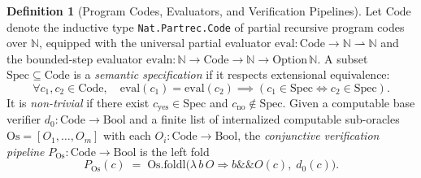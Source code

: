 \documentclass[11pt]{article}
\theoremstyle{plain}
\theoremstyle{definition}
\newtheorem{definition}[theorem]{Definition}
\theoremstyle{remark}
\newcommand{\Code}{\mathrm{Code}}
\newcommand{\eval}{\mathrm{eval}}
\newcommand{\evaln}{\mathrm{evaln}}
\newcommand{\Spec}{\mathrm{Spec}}
\newcommand{\Os}{\mathrm{Os}}
\begin{document}
\begin{definition}[Program Codes, Evaluators, and Verification Pipelines]
Let $\Code$ denote the inductive type \texttt{Nat.Partrec.Code} of partial
recursive program codes over $\mathbb{N}$, equipped with the universal partial
evaluator $\eval : \Code \to \mathbb{N} \rightharpoonup \mathbb{N}$ and the
bounded-step evaluator $\evaln : \mathbb{N} \to \Code \to \mathbb{N} \to
\mathrm{Option}\,\mathbb{N}$. A subset $\Spec \subseteq \Code$ is a
\emph{semantic specification} if it respects extensional equivalence:
\[
  \forall c_1, c_2 \in \Code,\quad
  \eval(c_1) = \eval(c_2) \implies (c_1 \in \Spec \iff c_2 \in \Spec).
\]
It is \emph{non-trivial} if there exist $c_{\mathrm{yes}} \in \Spec$ and
$c_{\mathrm{no}} \notin \Spec$. Given a computable base verifier
$d_0 : \Code \to \mathrm{Bool}$ and a finite list of internalized computable
sub-oracles $\Os = [O_1, \dots, O_m]$ with each $O_i : \Code \to \mathrm{Bool}$,
the \emph{conjunctive verification pipeline} $P_{\Os} : \Code \to \mathrm{Bool}$
is the left fold
\[
  P_{\Os}(c) \;=\; \Os.\mathrm{foldl}\bigl(\lambda\, b\, O \Rightarrow b \mathbin{\&\&} O(c),\; d_0(c)\bigr).
\]
\end{definition}
\end{document}
